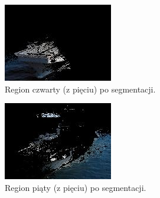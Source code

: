 \documentclass[10pt]{llncs}
\begin{document}
\FloatBarrier

\begin{figure}[h!]
  \centering
  \includegraphics[scale=.8, clip]{img/ship_k5_3.jpg}
	\caption[]
  {Region czwarty (z pięciu) po segmentacji.}
\end{figure}

\FloatBarrier

\begin{figure}[h!]
  \centering
  \includegraphics[scale=.8, clip]{img/ship_k5_4.jpg}
	\caption[]
  {Region piąty (z pięciu) po segmentacji.}
\end{figure}

\FloatBarrier
\end{document}

